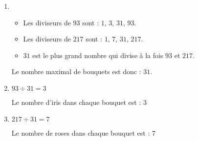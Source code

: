     \begin{enumerate}
        \item
        \begin{itemize}
            \item Les diviseurs de $93$ sont : $1$, $3$, $31$, $93$.
            \item Les diviseurs de $217$ sont : $1$, $7$, $31$, $217$.
            \item $31$ est le plus grand nombre qui divise à la fois $93$ et $217$.
        \end{itemize}
        Le nombre maximal de bouquets est donc : $31$.

        \item $93 \div 31 = 3$

        Le nombre d'iris dans chaque bouquet est : $3$
        \item $217 \div 31 = 7$

        Le nombre de roses dans chaque bouquet est : $7$
    \end{enumerate}


